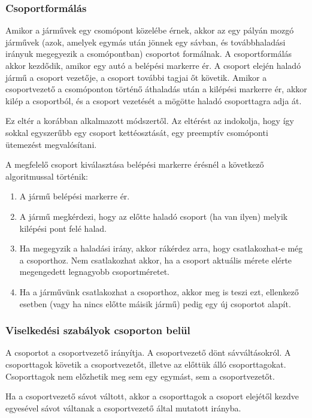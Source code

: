 \documentclass{article}
\begin{document}
		\subsubsection{Csoportformálás}
			Amikor a járművek egy csomópont közelébe érnek, akkor az egy pályán mozgó járművek (azok, amelyek egymás után jönnek egy sávban, és továbbhaladási irányuk megegyezik a csomópontban) csoportot formálnak. A csoportformálás akkor kezdődik, amikor egy autó a belépési markerre ér. A csoport elején haladó jármű a csoport vezetője, a csoport további tagjai őt követik. Amikor a csoportvezető a csomóponton történő áthaladás után a kilépési markerre ér, akkor kilép a csoportból, és a csoport vezetését a mögötte haladó csoporttagra adja át.
			
			Ez eltér a korábban alkalmazott módszertől. Az eltérést az indokolja, hogy így sokkal egyszerűbb egy csoport kettéosztását, egy preemptív csomóponti ütemezést megvalósítani.
			
			A megfelelő csoport kiválasztása belépési markerre érésnél a következő algoritmussal történik:
			\begin{enumerate}
				\item A jármű belépési markerre ér.
				\item A jármű megkérdezi, hogy az előtte haladó csoport (ha van ilyen) melyik kilépési pont felé halad.
				\item Ha megegyzik a haladási irány, akkor rákérdez arra, hogy csatlakozhat-e még a csoporthoz. Nem csatlakozhat akkor, ha a csoport aktuális mérete elérte megengedett legnagyobb csoportméretet.
				\item Ha a járművünk csatlakozhat a csoporthoz, akkor meg is teszi ezt, ellenkező esetben (vagy ha nincs előtte máisik jármű) pedig egy új csoportot alapít.
			\end{enumerate}
		
		\subsubsection{Viselkedési szabályok csoporton belül}
			A csoportot a csoportvezető irányítja. A csoportvezető dönt sávváltásokról. A csoporttagok követik a csoportvezetőt, illetve az előttük álló csoporttagokat. Csoporttagok nem előzhetik meg sem egy egymást, sem a csoportvezetőt.
			
			Ha a csoportvezető sávot váltott, akkor a csoporttagok a csoport elejétől kezdve egyesével sávot váltanak a csoportvezető által mutatott irányba.
			
\end{document}
